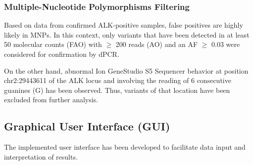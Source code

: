 \subsubsection{Multiple-Nucleotide Polymorphisms Filtering}

Based on data from confirmed ALK-positive samples, false positives are highly likely in MNPs. In this context, only variants that have been detected in at least 50 molecular counts (FAO) with $\ge$ 200 reads (AO) and an AF $\ge$ 0.03 were considered for confirmation by dPCR. 

On the other hand, abnormal Ion GeneStudio\texttrademark{} S5 Sequencer behavior at position chr2:29443611 of the ALK locus and involving the reading of 6 consecutive guanines (G) has been observed. Thus, variants of that location have been excluded from further analysis.

\subsection{Graphical User Interface (GUI)}

The implemented user interface has been developed to facilitate data input and interpretation of results.

